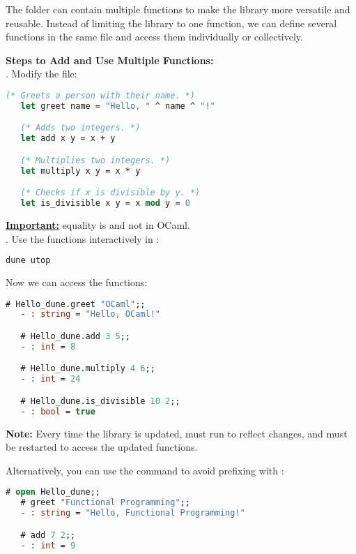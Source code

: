 The  folder can contain multiple functions to make the library more versatile and reusable. Instead of limiting the library to one function, we can define several functions in the same file and access them individually or collectively.

\noindent
\textbf{Steps to Add and Use Multiple Functions:}\\

. Modify the  file:
   \begin{lstlisting}[language=OCaml, caption={Adding Multiple Functions}]
   (* Greets a person with their name. *)
   let greet name = "Hello, " ^ name ^ "!"

   (* Adds two integers. *)
   let add x y = x + y

   (* Multiplies two integers. *)
   let multiply x y = x * y

   (* Checks if x is divisible by y. *)
   let is_divisible x y = x mod y = 0
   \end{lstlisting}
\underline{\textbf{Important:}} equality is \snippet{=} and not \snippet{==} in OCaml.\\

. Use the functions interactively in :
   \begin{lstlisting}[language=Bash]
   dune utop
   \end{lstlisting}

    \noindent Now we can access the functions:
   \begin{lstlisting}[language=OCaml, caption={Accessing Functions in Utop}]
   # Hello_dune.greet "OCaml";;
   - : string = "Hello, OCaml!"

   # Hello_dune.add 3 5;;
   - : int = 8

   # Hello_dune.multiply 4 6;;
   - : int = 24

   # Hello_dune.is_divisible 10 2;;
   - : bool = true
   \end{lstlisting}

   \begin{Note}
   \textbf{Note:} Every time the library is updated,  must run to reflect changes, and  
   must be restarted to access the updated functions.
   \end{Note}

   \newpage
   \noindent Alternatively, you can use the  command to avoid prefixing with :
   \begin{lstlisting}[language=OCaml, caption={Using the \texttt{open} Command}]
   # open Hello_dune;;
   # greet "Functional Programming";;
   - : string = "Hello, Functional Programming!"

   # add 7 2;;
   - : int = 9
   \end{lstlisting}

